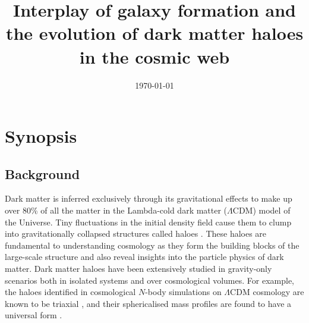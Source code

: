 \documentclass[a4paper, 12pt, oneside]{Thesis}  %
\begin{document}
\frontmatter      %

\title  {Interplay of galaxy formation and the evolution of dark matter haloes in the cosmic web}
\addresses  {\groupname\\\deptname\\\univname}  %
\date       {\today}
\subject    {}
\keywords   {}

\maketitle
{}  %

\fancyhead{}  %
\rhead{\thepage}  %
\lhead{}  %


\mainmatter	

\chapter*{Synopsis}

\section*{Background}

Dark matter is inferred exclusively through its gravitational effects to make up over 80\% of all the matter in the Lambda-cold dark matter ($\Lambda$CDM) model of the Universe. Tiny fluctuations in the initial density field cause them to clump into gravitationally collapsed structures called haloes \citep[][]{1974ApJ...187..425P,2002PhR...372....1C}. These haloes are fundamental to understanding cosmology as they form the building blocks of the large-scale structure and also reveal insights into the particle physics of dark matter. Dark matter haloes have been extensively studied in gravity-only scenarios both in isolated systems and over cosmological volumes. For example, the haloes identified in cosmological $N$-body simulations on $\Lambda$CDM cosmology are known to be triaxial \citep[][]{1988ApJ...327..507F}, and their sphericalised mass profiles are found to have a universal form \citep{1996ApJ...462..563N,1997ApJ...490..493N,2010MNRAS.402...21N}.
\end{document}

